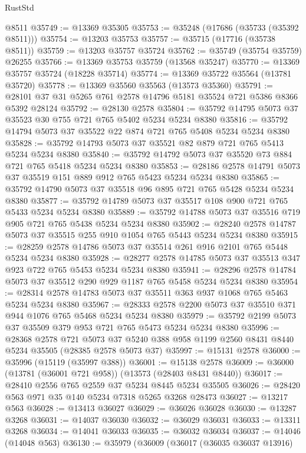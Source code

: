 \begin{lexlean}{RustStd}
\begin{coremodule}
    @8511
@35749 := @13369 @35305
@35753 := @35248 (@17686 (@35733 (@35392 @8511)))
@35754 := @13203 @35753
@35757 := @35715 (@17716 (@35738 @8511))
@35759 := @13203 @35757 @35724
@35762 := @35749 (@35754 @35759) @26255
@35766 := @13369 @35753 @35759 (@13568 @35247)
@35770 := @13369 @35757 @35724 (@18228 @35714)
@35774 := @13369 @35722 @35564 (@13781 @35720)
@35778 := @13369 @35560 @35563 (@13573 @35360)
@35791 := @28101 @37 @31 @5265 @761 @2578 @14796 @5181 @35524 @721 @5386 @8366 @5392 @28124
@35792 := @28130 @2578
@35804 := @35792 @14795 @5073 @37 @35523 @30 @755 @721 @765 @5402 @5234 @5234 @8380
@35816 := @35792 @14794 @5073 @37 @35522 @22 @874 @721 @765 @5408 @5234 @5234 @8380
@35828 := @35792 @14793 @5073 @37 @35521 @82 @879 @721 @765 @5413 @5234 @5234 @8380
@35840 := @35792 @14792 @5073 @37 @35520 @73 @884 @721 @765 @5418 @5234 @5234 @8380
@35853 := @28186 @2578 @14791 @5073 @37 @35519 @151 @889 @912 @765 @5423 @5234 @5234 @8380
@35865 := @35792 @14790 @5073 @37 @35518 @96 @895 @721 @765 @5428 @5234 @5234 @8380
@35877 := @35792 @14789 @5073 @37 @35517 @108 @900 @721 @765 @5433 @5234 @5234 @8380
@35889 := @35792 @14788 @5073 @37 @35516 @719 @905 @721 @765 @5438 @5234 @5234 @8380
@35902 := @28240 @2578 @14787 @5073 @37 @35515 @255 @910 @1054 @765 @5443 @5234 @5234 @8380
@35915 := @28259 @2578 @14786 @5073 @37 @35514 @261 @916 @2101 @765 @5448 @5234 @5234 @8380
@35928 := @28277 @2578 @14785 @5073 @37 @35513 @347 @923 @722 @765 @5453 @5234 @5234 @8380
@35941 := @28296 @2578 @14784 @5073 @37 @35512 @290 @929 @1187 @765 @5458 @5234 @5234 @8380
@35954 := @28314 @2578 @14783 @5073 @37 @35511 @363 @937 @1068 @765 @5463 @5234 @5234 @8380
@35967 := @28333 @2578 @2200 @5073 @37 @35510 @371 @944 @1076 @765 @5468 @5234 @5234 @8380
@35979 := @35792 @2199 @5073 @37 @35509 @379 @953 @721 @765 @5473 @5234 @5234 @8380
@35996 := @28368
    @2578
    @721
    @5073
    @37
    @5240
    @388
    @958
    @1199
    @2560
    @8431
    @8440
    @5234
    @35505
    (@28385 @2578 @5073 @37)
@35997 := @15131 @2578
@36000 := @35996 (@15119 (@35997 @388))
@36001 := @15138 @2578
@36009 := @36000 (@13781 (@36001 @721 @958)) (@13573 (@28403 @8431 @8440))
@36017 := @28410 @2556 @765 @2559 @37 @5234 @8445 @5234 @35505
@36026 := @28420 @563 @971 @35 @140 @5234 @7318 @5265 @3268 @28473
@36027 := @13217 @563
@36028 := @13413 @36027
@36029 := @36026 @36028
@36030 := @13287 @3268
@36031 := @14037 @36030
@36032 := @36029 @36031
@36033 := @13311 @3268
@36034 := @14041 @36033
@36035 := @36032 @36034
@36037 := @14046 (@14048 @563)
@36130 := @35979
    (@36009
      (@36017
        (@36035 @36037 @13916)

\end{coremodule}
\end{lexlean}

